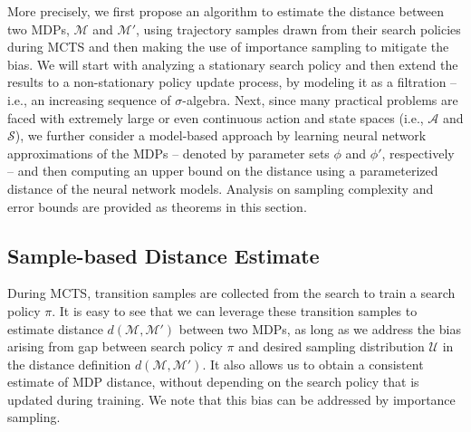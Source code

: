More precisely, we first propose an algorithm to estimate the distance between two MDPs, $\mathcal{M}$ and $\mathcal{M}'$, using trajectory samples drawn from their search policies during MCTS and then making the use of importance sampling to mitigate the bias. We will start with analyzing a stationary search policy and then extend the results to a non-stationary policy update process, by modeling it as a filtration – i.e., an increasing sequence of $\sigma$-algebra. Next, since many practical problems are faced with extremely large or even continuous action and state spaces (i.e., $\mathcal{A}$ and $\mathcal{S}$), we further consider a model-based approach by learning neural network approximations of the MDPs -- denoted by parameter sets $\phi$ and $\phi'$, respectively -- and then computing an upper bound on the distance using a parameterized distance of the neural network models. Analysis on sampling complexity and error bounds are provided as theorems in this section. 



\subsection{Sample-based Distance Estimate}

During MCTS, transition samples are collected from the search to train a search policy $\pi$. It is easy to see that we can leverage these transition samples to estimate distance $d(\mathcal{M},\mathcal{M}')$ between two MDPs, as long as we address the bias arising from gap between search policy $\pi$ and desired sampling distribution $\mathcal{U}$ in the distance definition $d(\mathcal{M},\mathcal{M}')$. It also allows us to obtain a consistent estimate of MDP distance, without depending on the search policy that is updated during training. We note that this bias can be addressed by importance sampling. 

